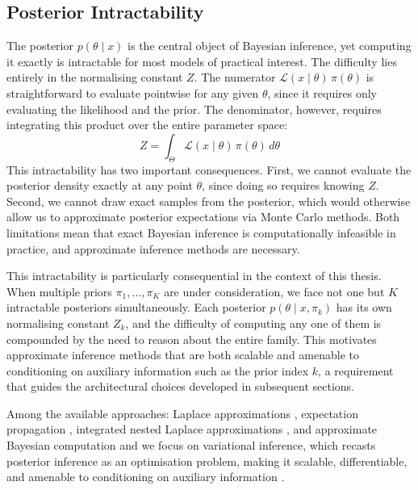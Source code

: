     \subsection{Posterior Intractability}
    
    The posterior $p(\theta \mid x)$ is the central object of Bayesian inference, yet computing it exactly is intractable for most models of practical interest. The difficulty lies entirely in the normalising constant $Z$. The numerator $\mathcal{L}(x \mid \theta)\, \pi(\theta)$ is straightforward to evaluate pointwise for any given $\theta$, since it requires only evaluating the likelihood and the prior. The denominator, however, requires integrating this product over the entire parameter space:
    \begin{equation}
        Z = \int_\Theta \mathcal{L}(x \mid \theta)\, \pi(\theta)\, d\theta
    \end{equation}
    This intractability has two important consequences. First, we cannot evaluate the posterior density exactly at any point $\theta$, since doing so requires knowing $Z$. Second, we cannot draw exact samples from the posterior, which would otherwise allow us to approximate posterior expectations via Monte Carlo methods. Both limitations mean that exact Bayesian inference is computationally infeasible in practice, and approximate inference methods are necessary.

    This intractability is particularly consequential in the context of this thesis. When multiple priors $\pi_1, \ldots, \pi_K$ are under consideration, we face not one but $K$ intractable posteriors simultaneously. Each posterior $p(\theta \mid x, \pi_k)$ has its own normalising constant $Z_k$, and the difficulty of computing any one of them is compounded by the need to reason about the entire family. This motivates approximate inference methods that are both scalable and amenable to conditioning on auxiliary information such as the prior index $k$, a requirement that guides the architectural choices developed in subsequent sections.

    Among the available approaches: Laplace approximations \citep{mackay1992}, expectation propagation \citep{minka2001}, integrated nested Laplace approximations \citep{rue2009}, and approximate Bayesian computation \citep{sisson2018} and we focus on variational inference, which recasts posterior inference as an optimisation problem, making it scalable, differentiable, and amenable to conditioning on auxiliary information \citep{blei2017}.

